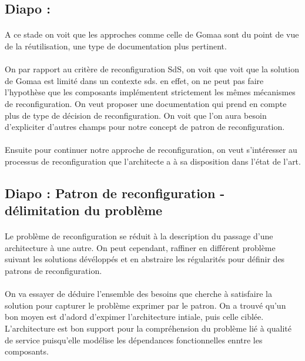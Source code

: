 \subsection{Diapo : }

\paragraph{}
A ce stade on voit que les approches comme celle de Gomaa sont du
point de vue de la réutilisation, une type de documentation plus
pertinent. 

\paragraph{}
On par rapport au critère de reconfiguration SdS, on voit que voit que
la solution de Gomaa est limité dans un contexte sds. en effet, on ne
peut pas faire l'hypothèse que les composants implémentent strictement
les mêmes mécanismes de reconfiguration. On veut proposer une
documentation qui prend en compte plus de type de décision de
reconfiguration. On voit que l'on aura besoin d'expliciter d'autres
champs pour notre concept de patron de reconfiguration.

\paragraph{}
Ensuite pour continuer notre approche de reconfiguration, on veut
s'intéresser au processus de reconfiguration que l'architecte a à sa
disposition dans l'état de l'art. 


 
\subsection{Diapo : Patron de reconfiguration - délimitation du problème}

\paragraph{}
Le problème de reconfiguration se réduit à la description du passage
d'une architecture à une autre. 
On peut cependant, raffiner en différent problème suivant les
solutions dévéloppés et en abstraire les régularités pour définir des
patrons de reconfiguration. 

\paragraph{}
On va essayer de déduire l'ensemble des besoins que cherche à
satisfaire la solution pour capturer le problème exprimer par le
patron. 
On a trouvé qu'un bon moyen est d'adord d'expimer l'architecture
intiale, puis celle ciblée. 
L'architecture est bon support pour la compréhension du problème lié à
qualité de service puisqu'elle modélise les dépendances fonctionnelles
enntre les composants. 

